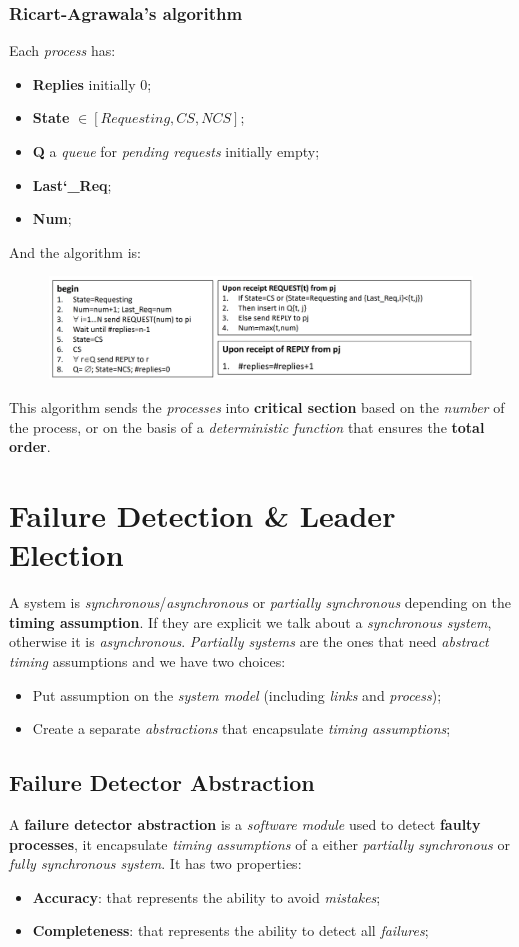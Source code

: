 \documentclass{article}
\begin{document}
\subsubsection{Ricart-Agrawala's algorithm}
Each \emph{process} has:
\begin{itemize}
\item \textbf{Replies} initially 0;
\item \textbf{State} $\in \left [ Requesting, CS, NCS \right ]$;
\item \textbf{Q} a \emph{queue} for \emph{pending requests} initially empty;
\item \textbf{Last\char`_Req};
\item \textbf{Num};
\end{itemize}
And the algorithm is:
\begin{figure}[H]
  \centering
  \includegraphics[scale=0.6]{cattura18.png}
\end{figure}
This algorithm sends the \emph{processes} into \textbf{critical section} based on the \emph{number} of the process, or on the basis of a \emph{deterministic function} that ensures the \textbf{total order}.
\clearpage
\section{Failure Detection \& Leader Election}
A system is \emph{synchronous}/\emph{asynchronous} or \emph{partially synchronous} depending on the \textbf{timing assumption}. If they are explicit we talk about a \emph{synchronous system}, otherwise it is \emph{asynchronous}. \emph{Partially systems} are the ones that need \emph{abstract timing} assumptions and we have two choices:
\begin{itemize}
\item Put assumption on the \emph{system model} (including \emph{links} and \emph{process});
\item Create a separate \emph{abstractions} that encapsulate \emph{timing assumptions};
\end{itemize}
\subsection{Failure Detector Abstraction}
A \textbf{failure detector abstraction} is a \emph{software module} used to detect \textbf{faulty processes}, it encapsulate \emph{timing assumptions} of a either \emph{partially synchronous} or\emph{ fully synchronous system}. It has two properties:
\begin{itemize}
\item \textbf{Accuracy}: that represents the ability to avoid \emph{mistakes};
\item \textbf{Completeness}: that represents the ability to detect all \emph{failures};
\end{itemize}
\end{document}
